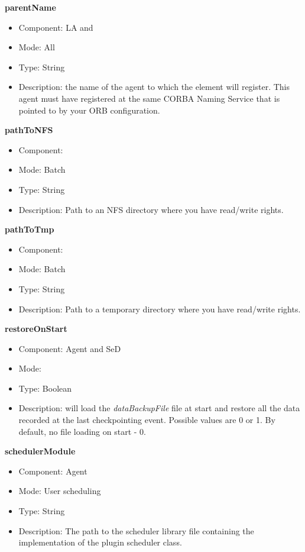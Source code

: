 \begin{description}

\item{\bf{parentName}}
  \begin{itemize}
  \item Component: LA and \sed
  \item Mode: All
  \item Type: String
  \item Description: the name of the agent to which the element will
    register. This agent must have registered at the same CORBA Naming
    Service that is  pointed to by your ORB configuration.
  \end{itemize}

\item{\bf{pathToNFS}}
  \begin{itemize}
  \item Component: \sed
  \item Mode: Batch
  \item Type: String
  \item Description: Path to an NFS directory where you have read/write rights.
  \end{itemize}

\item{\bf{pathToTmp}}
  \begin{itemize}
  \item Component: \sed
  \item Mode: Batch
  \item Type: String
  \item Description: Path to a temporary directory where you have
    read/write rights.
  \end{itemize}


\item{\bf{restoreOnStart}}
  \begin{itemize}
  \item Component: Agent and SeD
  \item Mode: \dagda
  \item Type: Boolean
  \item Description: \dagda will load the \textit{dataBackupFile} file at start and
restore all the data recorded at the last checkpointing event. Possible values
are 0 or 1. By default, no file loading on start - 0.
  \end{itemize}


\item{\bf{schedulerModule}}
  \begin{itemize}
  \item Component: Agent
  \item Mode: User scheduling
  \item Type: String
  \item Description: The path to the scheduler library file containing the
  implementation of the plugin scheduler class.
  \end{itemize}


\end{description}
